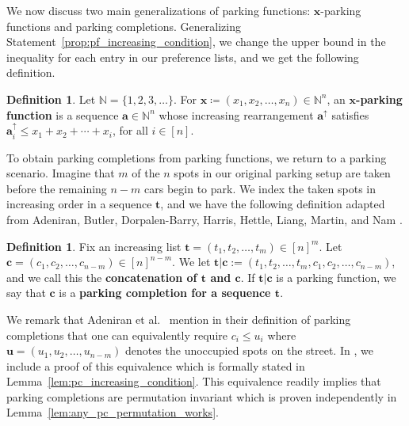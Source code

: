 \documentclass{amsart}
\theoremstyle{definition}
\newtheorem{definition}[theorem]{Definition}
\numberwithin{equation}{section}
\begin{document}
We now discuss two main generalizations of parking functions: $\mathbf{x}$-parking functions and parking completions.
Generalizing Statement~\eqref{prop:pf_increasing_condition}, we change the upper bound in the inequality for each entry in our preference lists, and we get the following definition.

\begin{definition}\label{def:x_parking_function}
    Let $\mathbb{N}=\{1,2,3,\ldots\}$. For $\mathbf{x} \coloneqq (x_1, x_2, \hdots, x_n) \in \mathbb{N}^n$, an \textbf{$\mathbf{x}$-parking function} is a sequence $\mathbf{a} \in\mathbb{N}^n$ whose increasing rearrangement $\mathbf{a}^\uparrow$ satisfies $\mathbf{a}_i^\uparrow \leq x_1 + x_2 + \cdots + x_i$, for all $i\in[n]$.
\end{definition} 

To obtain parking completions from parking functions, we return to a parking scenario.
Imagine that $m$ of the $n$ spots in our original parking setup are taken before the remaining $n-m$ cars begin to park.
We index the taken spots in increasing order in a sequence $\mathbf{t}$, and we have the following definition adapted from Adeniran, Butler, Dorpalen-Barry, Harris, Hettle, Liang, Martin, and Nam \cite{bib:ParkingCompletions}.

\begin{definition}\label{def:parking_completion}
    Fix an increasing list $\mathbf{t} = (t_1, t_2, \hdots, t_m) \in [n]^m$.
    Let $\mathbf{c} = (c_1, c_2, \hdots, c_{n-m}) \in [n]^{n-m}$.
    We let $\mathbf{t}|\mathbf{c} := (t_1, t_2, \hdots, t_m, c_1, c_2, \hdots, c_{n-m})$, and we call this the \textbf{concatenation of $\mathbf{t}$ and $\mathbf{c}$}.
    If $\mathbf{t}|\mathbf{c}$ is a parking function, we say that $\mathbf{c}$ is a \textbf{parking completion for a sequence $\mathbf{t}$}.
\end{definition}

We remark that Adeniran et al.\ \cite{bib:ParkingCompletions} mention in their definition of parking completions that one can equivalently require $c_i \leq u_i$ where $\mathbf{u} = (u_1, u_2, \hdots, u_{n-m})$ denotes the unoccupied spots on the street. 
In , we include a proof of this equivalence which is formally stated in Lemma~\ref{lem:pc_increasing_condition}. 
This equivalence readily implies that parking completions are permutation invariant which is proven independently in Lemma~\ref{lem:any_pc_permutation_works}.
\end{document}
